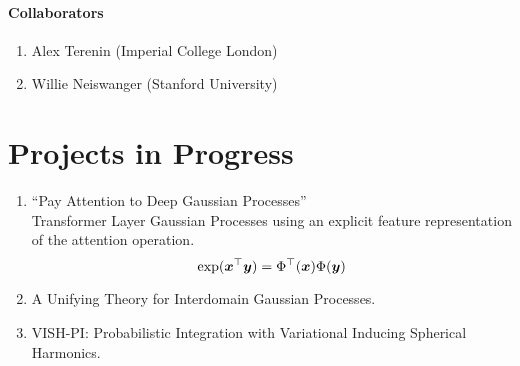 \paragraph{Collaborators}
\begin{enumerate}
    \item Alex Terenin (Imperial College London)
    \item Willie Neiswanger (Stanford University)
\end{enumerate}


\section{Projects in Progress}
\begin{enumerate}
    \item ``Pay Attention to Deep Gaussian Processes''\\
    Transformer Layer Gaussian Processes using an explicit feature representation of the attention operation.
    \begin{equation*}
        \exp(\bm{x}^\top \bm{y}) = \Phi^\top(\bm{x}) \Phi(\bm{y})
    \end{equation*}
    \item A Unifying Theory for Interdomain Gaussian Processes.
    \item VISH-PI: Probabilistic Integration with Variational Inducing Spherical Harmonics.
\end{enumerate}



